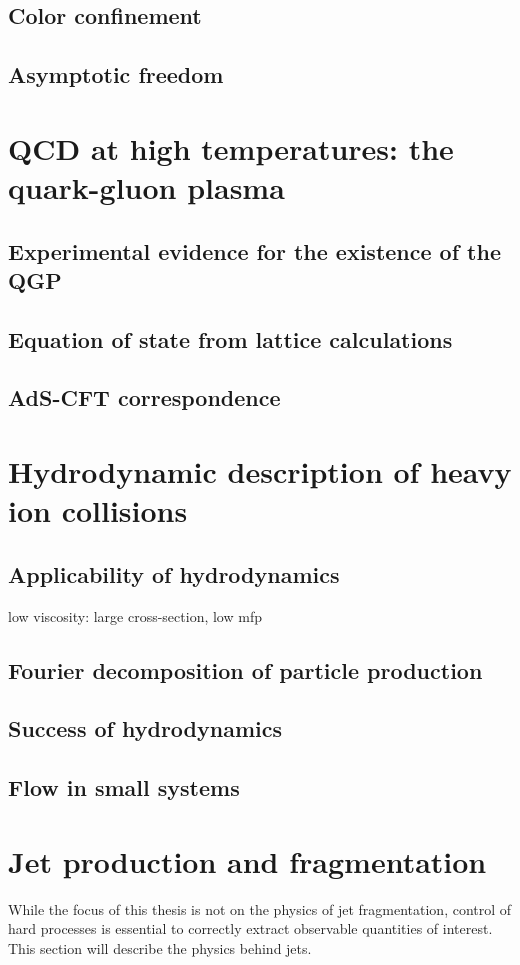 \subsection{Color confinement}
\subsection{Asymptotic freedom}

\section{QCD at high temperatures: the quark-gluon plasma}
\subsection{Experimental evidence for the existence of the QGP}
\subsection{Equation of state from lattice calculations}
\subsection{AdS-CFT correspondence}

\section{Hydrodynamic description of heavy ion collisions}
\subsection{Applicability of hydrodynamics}
low viscosity: large cross-section, low mfp
\subsection{Fourier decomposition of particle production}
\subsection{Success of hydrodynamics}
\subsection{Flow in small systems}

\section{Jet production and fragmentation}
While the focus of this thesis is not on the physics of jet fragmentation, control of hard processes is essential to correctly extract observable quantities of interest.
This section will describe the physics behind jets.

